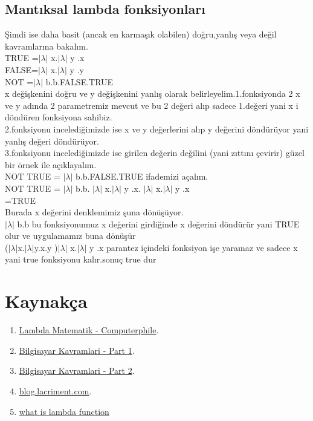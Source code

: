 \documentclass[12pt]{article}
\begin{document}
 
\subsection{Mantıksal lambda fonksiyonları }
Şimdi ise daha basit (ancak en karmaşık olabilen) doğru,yanlış veya değil kavramlarına bakalım. \\
TRUE =$|\lambda|$ x.$|\lambda|$ y .x  \\
FALSE=$|\lambda|$ x.$|\lambda|$ y .y  \\
NOT =$|\lambda|$ b.b.FALSE.TRUE  \\
x değişkenini doğru ve  y değişkenini yanlış olarak belirleyelim.1.fonksiyonda 2 x ve y adında 2 parametremiz mevcut ve bu 2 değeri alıp sadece 1.değeri yani x i döndüren fonksiyona sahibiz.\\
2.fonksiyonu incelediğimizde ise x ve y değerlerini alıp  y değerini döndürüyor yani yanlış  değeri döndürüyor.\\
3.fonksiyonu incelediğimizde ise girilen değerin değilini (yani zıttını çevirir) güzel bir örnek ile açıklayalım.\\
NOT TRUE = $|\lambda|$ b.b.FALSE.TRUE   ifademizi açalım.\\
NOT TRUE = $|\lambda|$ b.b. $|\lambda|$ x.$|\lambda|$ y .x. $|\lambda|$ x.$|\lambda|$ y .x\\
=TRUE
\\ Burada x değerini  denklemimiz şuna dönüşüyor.\\
$|\lambda|$ b.b  bu fonksiyonumuz  x değerini girdiğinde x değerini döndürür yani TRUE olur ve uygulamamız buna dönüşür\\
($|\lambda|$x.$|\lambda|$y.x.y )$|\lambda|$ x.$|\lambda|$ y .x parantez içindeki fonksiyon işe yaramaz ve sadece x yani true fonksiyonu kalır.sonuç true dur


  \newpage

\section{Kaynakça}
\begin{enumerate}
	\item  \href{https://www.youtube.com/watch?v=eis11j_iGMs}{Lambda Matematik - Computerphile}.
	\item  \href{https://www.youtube.com/watch?v=9l6YVf0xqIs}{Bilgisayar Kavramlari - Part 1}.
	\item  \href{https://www.youtube.com/watch?v=v0cNGm5YgZ8}{Bilgisayar Kavramlari - Part 2}.
	\item  \href{https://blog.lacriment.com/2019-02-01/fonskiyonel-programlama-1-lambda-kalkulus-1}{blog.lacriment.com}.
	\item  \href{https://stackoverflow.com/questions/16501/what-is-a-lambda-function}{what is lambda function}
	
	
\end{enumerate}
\end{document}
